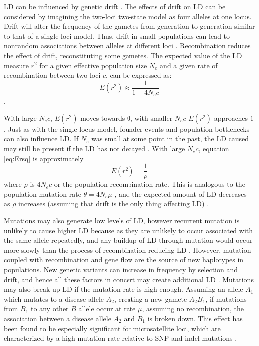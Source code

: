 LD can be influenced by genetic drift \parencite{Hill1968,Ohta1969}. The effects of drift on LD can be considered by imagining the two-loci two-state model as four alleles at one locus.
Drift will alter the frequency of the gametes from generation to generation similar to that of a single loci model.
Thus, drift in small populations can lead to nonrandom associations between alleles at different loci \parencite{Hedrick2010}.
Recombination reduces the effect of drift, reconstituting some gametes.
The expected value of the LD measure $r^2$ for a given effective population size $N_e$ and a given rate of recombination between two loci $c$, can be expressed as:
\begin{equation} \label{eq:Ersq}
E(r^2)\approx\frac{1}{1+4N_ec}
\end{equation}
\parencite{Hill1968,Ohta1969}.

With large $N_ec$, $E(r^2)$ moves towards $0$, with smaller $N_ec$ $E(r^2)$ approaches $1$.
Just as with the single locus model, founder events and population bottlenecks can also influence LD.
If $N_e$ was small at some point in the past, the LD caused may still be present if the LD has not decayed \parencite{Hedrick2010}.
With large $N_ec$, equation \ref{eq:Ersq} is approximately
\begin{equation}
E(r^2)=\frac{1}{\rho}
\end{equation}
where $\rho$ is $4N_ec$ or the population recombination rate.
This is analogous to the population mutation rate $\theta = 4N_e\mu$ \parencite{Wall2000,Stumpf2003,Padhukasahasram2006}, and the expected amount of LD decreases as $\rho$ increases (assuming that drift is the only thing affecting LD) \parencite{Pritchard2001,Hedrick2010}.

Mutations may also generate low levels of LD, however recurrent mutation is unlikely to cause higher LD because as they are unlikely to occur associated with the same allele repeatedly, and any buildup of LD through mutation would occur more slowly than the process of recombination reducing LD \parencite{Hedrick2010}.
However, mutation coupled with recombination and gene flow are the source of new haplotypes in populations.
New genetic variants can increase in frequency by selection and drift, and hence all these factors in concert may create additional LD \parencite{Hedrick2010}.
Mutations may also break up LD if the mutation rate is high enough.
Assuming an allele $A_1$ which mutates to a disease allele $A_2$, creating a new gamete $A_2B_1$, if mutations from $B_1$ to any other $B$ allele occur at rate $\mu$, assuming no recombination, the association between a disease allele $A_2$ and $B_1$ is broken down.
This effect has been found to be especially significant for microsatellite loci, which are characterized by a high mutation rate relative to SNP and indel mutations \parencite{Payseur2008}.

